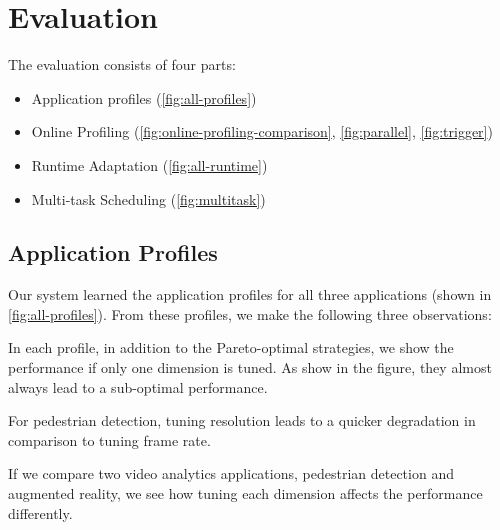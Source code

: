 \section{Evaluation}
\label{sec:evaluation}

The evaluation consists of four parts:

\begin{itemize}[leftmargin=16pt]
\item Application profiles (\autoref{fig:all-profiles})
\item Online Profiling (\autoref{fig:online-profiling-comparison},
  \autoref{fig:parallel}, \autoref{fig:trigger})
\item Runtime Adaptation (\autoref{fig:all-runtime})
\item Multi-task Scheduling (\autoref{fig:multitask})
\end{itemize}

\subsection{Application Profiles}
\label{sec:application-profiles}

Our system learned the application profiles for all three applications (shown in
\autoref{fig:all-profiles}). From these profiles, we make the following three
observations:

 In each profile,
in addition to the Pareto-optimal strategies, we show the performance if only
one dimension is tuned. As show in the figure, they almost always lead to a
sub-optimal performance.

For pedestrian detection, tuning resolution leads to a quicker degradation in
comparison to tuning frame rate.

If we compare two video analytics applications, pedestrian detection and
augmented reality, we see how tuning each dimension affects the performance
differently.

